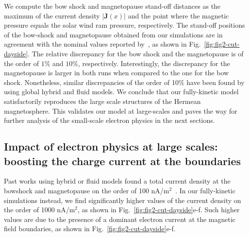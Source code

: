 \documentclass{aa}
\begin{document}
We compute the bow shock and magnetopause stand-off distances as the maximum of the current density $|\textbf{J}(x)|$ and the point where the magnetic pressure equals the solar wind ram pressure, respectively. The stand-off positions of the bow-shock and magnetopause obtained from our simulations are in agreement with the nominal values reported by~\citet{Winslow2013}, as shown in Fig.~\ref{fig:fig2-cut-dayside}. The relative discrepancy for the bow shock and the magnetopause is of the order of $1\%$ and $10\%$, respectively. 
Interestingly, the discrepancy for the magnetopause is larger in both runs when compared to the one for the bow shock. Nonetheless, similar discrepancies of the order of 10\% have been found by~\citet{Aizawa2021} using global hybrid and fluid models.
We conclude that our fully-kinetic model satisfactorily reproduces the large scale structures of the Hermean magnetosphere. 
This validates our model at large-scales and paves the way for further analysis of the small-scale electron physics in the next sections.


\subsection{Impact of electron physics at large scales: boosting the charge current at the boundaries}

Past works using hybrid or fluid models found a total current density at the bowshock and magnetopause on the order of 100 nA/m$^2$~\citep{Janhunen2004,Benna2010,Exner2020,Aizawa2021}.
In our fully-kinetic simulations instead, we find significantly higher values of the current density on the order of 1000 nA/m$^2$, as shown in Fig.~\ref{fig:fig2-cut-dayside}e-f.
Such higher values are due to the presence of a dominant electron current at the magnetic field boundaries, as shown in Fig.~\ref{fig:fig2-cut-dayside}e-f.
\end{document}
